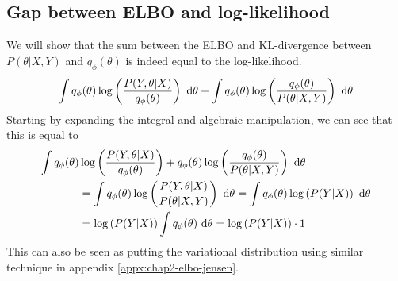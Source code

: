 \subsection{Gap between ELBO and log-likelihood}
\label{appx:chap2-elbo-gap}
We will show that the sum between the ELBO and KL-divergence between $P(\theta | X, Y)$ and $q_{\phi}(\theta)$ is indeed equal to the log-likelihood.
\begin{equation*}
    \int q_{\phi}(\theta) \log\left(\frac{P(Y, \theta | X)}{q_{\phi}(\theta)}\right) \ \mathrm{d} \theta + \int q_{\phi} (\theta) \log\left( \frac{q_{\phi} (\theta)}{P(\theta | X, Y)} \right) \ \mathrm{d} \theta
\end{equation*}
Starting by expanding the integral and algebraic manipulation, we can see that this is equal to \begin{equation*}
    \begin{aligned}
        \int q_{\phi}(\theta) &\log\left(\frac{P(Y, \theta | X)}{q_{\phi}(\theta)}\right) +  q_{\phi} (\theta) \log\left( \frac{q_{\phi} (\theta)}{P(\theta | X, Y)} \right) \ \mathrm{d} \theta   \\ 
        &= \int q_{\phi}(\theta) \log\left( \frac{P(Y, \theta | X)}{P(\theta | X, Y)} \right) \ \mathrm{d} \theta = \int q_{\phi}(\theta) \log\left( P(Y | X) \right) \ \mathrm{d} \theta \\
        &= \log\left( P(Y | X) \right) \int q_{\phi}(\theta) \ \mathrm{d} \theta = \log\left( P(Y | X) \right) \cdot 1
    \end{aligned}
\end{equation*}
This can also be seen as putting the variational distribution using similar technique in appendix \ref{appx:chap2-elbo-jensen}.